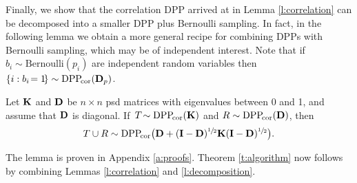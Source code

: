 \documentclass[thesis.tex]{subfiles}
\begin{document}
Finally, we show that the correlation DPP arrived at in Lemma
\ref{l:correlation} can be decomposed into a smaller DPP plus
Bernoulli sampling. In fact, in the following lemma we obtain a more
general recipe for combining DPPs with Bernoulli sampling, which may
be of independent interest. Note that if $b_i\sim\mathrm{Bernoulli}(p_i)$ are independent random
variables then $\{i:b_i\!=1\!\}\sim{{\mathrm{DPP}}_{\!\mathrm{cor}}}(\mathbf D_p)$.
\begin{lemma}\label{l:decomposition}
  Let $\mathbf K$ and $\mathbf D$ be $n\times n$ psd matrices with eigenvalues between
0 and 1, and assume that $\mathbf D$ is diagonal. If\, $T\!\sim{{\mathrm{DPP}}_{\!\mathrm{cor}}}(\mathbf K)$ and
$R\sim{{\mathrm{DPP}}_{\!\mathrm{cor}}}(\mathbf D)$, then
\begin{align*}T\cup R\sim {{\mathrm{DPP}}_{\!\mathrm{cor}}}\big(\mathbf D+(\mathbf I-\mathbf D)^{\sfrac12}\mathbf K
  (\mathbf I-\mathbf D)^{\sfrac12}\big).
  \end{align*}
\end{lemma}
The lemma is proven in Appendix \ref{a:proofs}. Theorem
\ref{t:algorithm} now follows by combining Lemmas \ref{l:correlation} and \ref{l:decomposition}.
\end{document}
